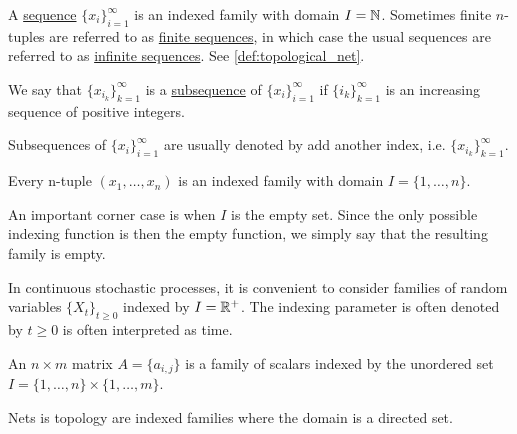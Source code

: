\begin{definition}\label{def:sequence}
  A \ul{sequence} $\{ x_i \}_{i=1}^\infty$ is an indexed family with domain $I = \mathbb N$. Sometimes finite $n$-tuples are referred to as \ul{finite sequences}, in which case the usual sequences are referred to as \ul{infinite sequences}. See \cref{def:topological_net}.

  We say that $\{ x_{i_k} \}_{k=1}^\infty$ is a \ul{subsequence} of $\{ x_i \}_{i=1}^\infty$ if $\{ i_k \}_{k=1}^\infty$ is an increasing sequence of positive integers.

  Subsequences of $\{ x_i \}_{i=1}^\infty$ are usually denoted by add another index, i.e. $\{ x_{i_k} \}_{k=1}^\infty$.
\end{definition}

\begin{example}\label{ex:indexed_families}
  \mbox{}
  \begin{defenum}
    \item Every n-tuple $(x_1, \ldots, x_n)$ is an indexed family with domain $I = \{ 1, \ldots, n \}$.

    \item An important corner case is when $I$ is the empty set. Since the only possible indexing function is then the empty function, we simply say that the resulting family is empty.

    \item In continuous stochastic processes, it is convenient to consider families of random variables $\{ X_t \}_{t \geq 0}$ indexed by $I = \mathbb R^+$. The indexing parameter is often denoted by $t \geq 0$ is often interpreted as time.

    \item An $n \times m$ matrix $A = \{ a_{i,j} \}$ is a family of scalars indexed by the unordered set $I = \{ 1, \ldots, n \} \times \{ 1, \ldots, m \}$.

    \item Nets is topology are indexed families where the domain is a directed set.
  \end{defenum}
\end{example}

